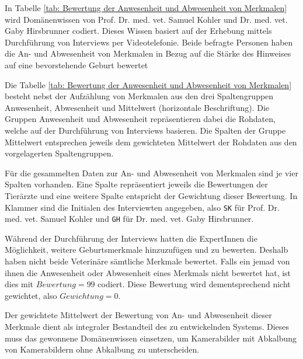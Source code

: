 In Tabelle \ref{tab: Bewertung der Anwesenheit und Abwesenheit von Merkmalen} wird Domänenwissen von Prof. Dr. med. vet. Samuel Kohler und  Dr. med. vet. Gaby Hirsbrunner codiert. Dieses Wissen basiert auf der Erhebung mittels Durchführung von Interviews per Videotelefonie. Beide befragte Personen haben die An- und Abwesenheit von Merkmalen in Bezug auf die Stärke des Hinweises auf eine bevorstehende Geburt bewertet

Die Tabelle \ref{tab: Bewertung der Anwesenheit und Abwesenheit von Merkmalen} besteht nebst der Aufzählung von Merkmalen aus den drei Spaltengruppen \flqq{}Anwesenheit\frqq{}, \flqq{}Abwesenheit\frqq{} und \flqq{}Mittelwert\frqq{} (horizontale Beschriftung). Die Gruppen \flqq{}Anwesenheit\frqq{} und \flqq{}Abwesenheit\frqq{} repräsentieren dabei die Rohdaten, welche auf der Durchführung von Interviews basieren. Die Spalten der Gruppe \flqq{}Mittelwert\frqq{} entsprechen jeweils dem gewichteten Mittelwert der Rohdaten aus den vorgelagerten Spaltengruppen.

Für die gesammelten Daten zur An- und Abwesenheit von Merkmalen sind je vier Spalten vorhanden. Eine Spalte repräsentiert jeweils die Bewertungen der Tierärzte und eine weitere Spalte entspricht der Gewichtung dieser Bewertung. In Klammer sind die Initialen des Interviewten angegeben, also \texttt{SK} für Prof. Dr. med. vet. Samuel Kohler und  \texttt{GH} für Dr. med. vet. Gaby Hirsbrunner.

Während der Durchführung der Interviews hatten die ExpertInnen die Möglichkeit, weitere Geburtsmerkmale hinzuzufügen und zu bewerten. Deshalb haben nicht beide Veterinäre sämtliche Merkmale bewertet. Falls ein jemad von ihnen die Anwesenheit oder Abwesenheit eines Merkmals nicht bewertet hat, ist dies mit $Bewertung=99$ codiert. Diese Bewertung wird dementsprechend nicht gewichtet, also $Gewichtung=0$. 

Der gewichtete Mittelwert der Bewertung von An- und Abwesenheit dieser Merkmale dient als integraler Bestandteil des zu entwickelnden Systems. Dieses muss das gewonnene Domänenwissen einsetzen, um Kamerabilder mit Abkalbung von Kamerabildern ohne Abkalbung zu unterscheiden.



